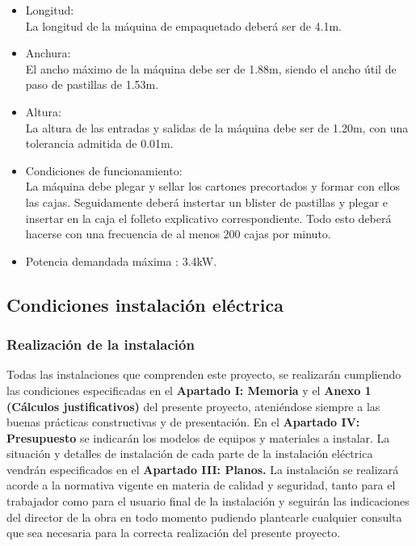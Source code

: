 		\begin{itemize}
			\item{Longitud:}\\
			La longitud de la máquina de empaquetado deberá ser de 4.1m. 

			\item{Anchura:}\\
			El ancho máximo de la máquina debe ser de 1.88m, siendo el ancho útil de paso de pastillas de 1.53m.
			
			\item{Altura:}\\
			La altura de las entradas y salidas de la máquina debe ser de 1.20m, con una tolerancia admitida de 0.01m.
			
			
			\item{Condiciones de funcionamiento: }\\
			La máquina debe plegar y sellar los cartones precortados y formar con ellos las cajas. Seguidamente deberá instertar un blister de pastillas y plegar e insertar en la caja el folleto explicativo correspondiente. Todo esto deberá hacerse con una frecuencia de al menos 200 cajas por minuto.
			

			\item{Potencia demandada máxima :} 3.4kW.
		
		\end{itemize}





\subsection{Condiciones instalación eléctrica}



\subsubsection{Realización de la instalación}

Todas las instalaciones que comprenden este proyecto, se realizarán cumpliendo las condiciones especificadas en el {\bfseries Apartado I: Memoria} y el {\bfseries Anexo 1 (Cálculos justificativos)} del presente proyecto, ateniéndose siempre a las buenas prácticas constructivas y de presentación. En el {\bfseries Apartado IV: Presupuesto} se indicarán los modelos de equipos y materiales a instalar. %
La situación y detalles de instalación de cada parte de la instalación eléctrica vendrán especificados en el {\bfseries Apartado III: Planos.} La instalación se realizará acorde a la normativa vigente en materia de calidad y seguridad, tanto para el trabajador como para el usuario final de la instalación y seguirán las indicaciones del director de la obra en todo momento pudiendo plantearle cualquier consulta que sea necesaria para la correcta realización del presente proyecto.


